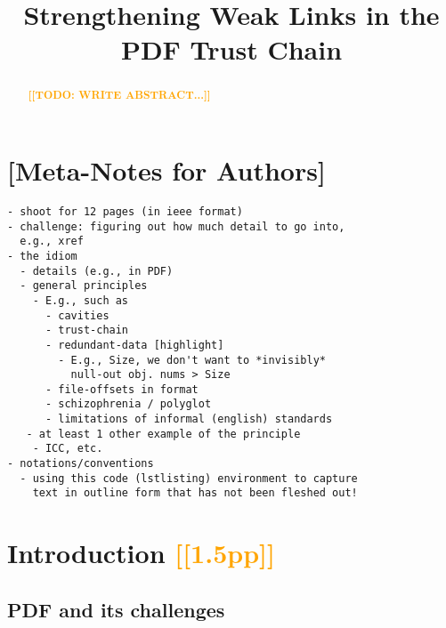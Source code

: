 \documentclass[conference,10pt]{IEEEtran}
\newcommand{\note}[1]{\noteYes{#1}}
\newcommand{\noteYes}[1]{\textbf{\textcolor{orange}{[[#1]]}}}
\newcommand{\todo}[1]{\note{TODO: #1}}
\begin{document}
\date{}

\title{Strengthening Weak Links in the PDF Trust Chain}

\author{
     \and
}

\maketitle

\begin{abstract}

\todo{WRITE ABSTRACT...}
  
\end{abstract}

\section{[Meta-Notes for Authors]}
\begin{lstlisting}
- shoot for 12 pages (in ieee format)
- challenge: figuring out how much detail to go into,
  e.g., xref
- the idiom
  - details (e.g., in PDF)
  - general principles
    - E.g., such as
      - cavities
      - trust-chain 
      - redundant-data [highlight]
        - E.g., Size, we don't want to *invisibly*
          null-out obj. nums > Size
      - file-offsets in format
      - schizophrenia / polyglot
      - limitations of informal (english) standards
   - at least 1 other example of the principle
    - ICC, etc.
- notations/conventions
  - using this code (lstlisting) environment to capture
    text in outline form that has not been fleshed out!
\end{lstlisting}

\section{Introduction \note{1.5pp}}
\label{sec:intro}
\subsection{PDF and its challenges}
\end{document}
